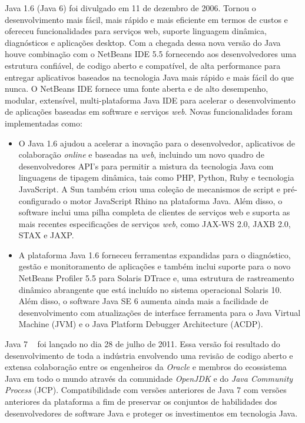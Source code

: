 Java 1.6 (Java 6) foi divulgado em 11 de dezembro de 2006. Tornou o desenvolvimento mais fácil, mais rápido e mais eficiente em termos de custos e ofereceu funcionalidades para serviços web, suporte linguagem dinâmica, diagnósticos e aplicações desktop. Com a chegada dessa nova versão do Java houve combinação com o NetBeans IDE 5.5 fornecendo aos desenvolvedores uma estrutura confiável, de codigo aberto e compatível, de alta performance para entregar aplicativos baseados na tecnologia Java mais rápido e mais fácil do que nunca. O NetBeans IDE fornece uma fonte aberta e de alto desempenho, modular, extensível, multi-plataforma Java IDE para acelerar o desenvolvimento de aplicações baseadas em software e serviços {\it web}.
Novas funcionalidades foram implementadas como:

\begin{itemize}
  \item O Java 1.6 ajudou a acelerar a inovação para o desenvolvedor, aplicativos de colaboração {\it online} e baseadas na {\it web}, incluindo um novo quadro de desenvolvedores \acs{API}'s para permitir a mistura da tecnologia Java com linguagens de tipagem dinâmica, tais como PHP, Python, Ruby e tecnologia JavaScript. A Sun também criou uma coleção de mecanismos de script e pré-configurado o motor JavaScript Rhino na plataforma Java. Além disso, o software inclui uma pilha completa de clientes de serviços web e suporta as mais recentes especificações de serviços {\it web}, como \acs{JAX-WS} 2.0, \acs{JAXB} 2.0, \acs{STAX} e \acs{JAXP}.
  \item A plataforma Java 1.6 forneceu ferramentas expandidas para o diagnóstico, gestão e monitoramento de aplicações e também inclui suporte para o novo NetBeans Profiler 5.5 para Solaris DTrace e, uma estrutura de rastreamento dinâmico abrangente que está incluído no sistema operacional Solaris 10. Além disso, o software Java SE 6 aumenta ainda mais a facilidade de desenvolvimento com atualizações de interface ferramenta para o Java Virtual Machine (\acs{JVM}) e o Java Platform Debugger Architecture (\acs{ACDP}).
\end{itemize}

Java 7 ~\cite{JSE7} foi lançado no dia 28 de julho de 2011. Essa versão foi resultado do desenvolvimento de toda a indústria envolvendo uma revisão de codigo aberto e extensa colaboração entre os engenheiros da {\it Oracle} e membros do ecossistema Java em todo o mundo através da comunidade {\it OpenJDK} e do {\it Java Community Process} (\acs{JCP}). Compatibilidade com versões anteriores de Java 7 com versões anteriores da plataforma a fim de preservar os conjuntos de habilidades dos desenvolvedores de software Java e proteger os investimentos em tecnologia Java.

